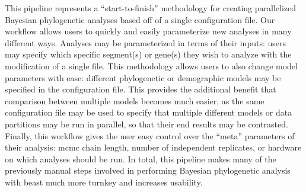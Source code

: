 This pipeline represents a ``start-to-finish'' methodology for creating parallelized Bayesian phylogenetic analyses based off of a single configuration file.
Our workflow allows users to quickly and easily parameterize new analyses in many different ways.
Analyses may be parameterized in terms of their inputs: users may specify which specific segment(s) or gene(s) they wish to analyze with the modification of a single file.
This methodology allows users to also change model parameters with ease:
different phylogenetic or demographic models may be specified in the configuration file.
This provides the additional benefit that comparison between multiple models becomes much easier, as the same configuration file may be used to specify that multiple different models or data partitions may be run in parallel, so that their end results may be contrasted.
Finally, this workflow gives the user easy control over the ``meta'' parameters of their analysis: \gls{mcmc} chain length, number of independent replicates, or hardware on which analyses should be run.
In total, this pipeline makes many of the previously manual steps involved in performing Bayesian phylogenetic analysis with \gls{beast} much more turnkey and increases usability.

\cleardoublepage

